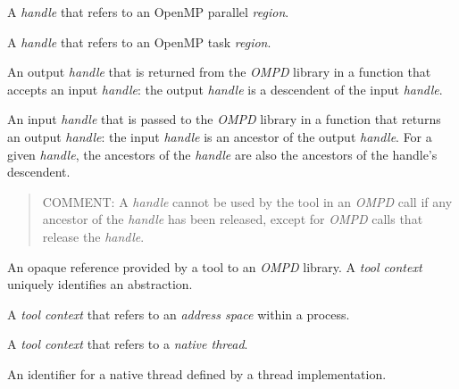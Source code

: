 \glossarydefstart
A \emph{handle} that refers to an OpenMP parallel \emph{region}.
\glossarydefend

\glossarydefstart
A \emph{handle} that refers to an OpenMP task \emph{region}.
\glossarydefend

\glossarydefstart
An output \emph{handle} that is returned from the \emph{OMPD} library 
in a function that accepts an input \emph{handle}: the output \emph{handle} 
is a descendent of the input \emph{handle}.
\glossarydefend

\glossarydefstart
An input \emph{handle} that is passed to the \emph{OMPD} library in a 
function that returns an output \emph{handle}: the input \emph{handle}
is an ancestor of the output \emph{handle}. For a given \emph{handle},
the ancestors of the \emph{handle} are also the ancestors of the handle's 
descendent.

\begin{quote}
	COMMENT: A \emph{handle} cannot be used by the tool in an \emph{OMPD}
        call if any ancestor of the \emph{handle} has been released, except 
        for \emph{OMPD} calls 	that release the \emph{handle}.
\end{quote}
\glossarydefend

\glossarydefstart
An opaque reference provided by a tool to an \emph{OMPD} library. 
A \emph{tool context} uniquely identifies an abstraction.
\glossarydefend

\glossarydefstart
A \emph{tool context} that refers to an \emph{address space} within a process.
\glossarydefend

\glossarydefstart
A \emph{tool context} that refers to a \emph{native thread}.
\glossarydefend

\glossarydefstart
An identifier for a native thread defined by a thread implementation.
\glossarydefend


